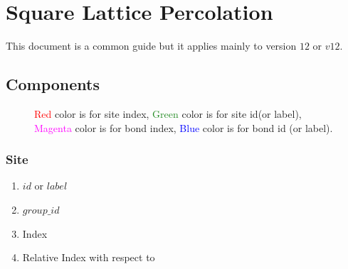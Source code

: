 %

	\chapter{Square Lattice Percolation}
	This document is a common guide but it applies mainly to version $12$ or $v12$.
	
	\section{Components}
	\begin{figure}
		\caption{\textcolor{red}{Red} color is for site index, \textcolor{ForestGreen}{Green} color is for site id(or label), \textcolor{magenta}{Magenta} color is for bond index, \textcolor{blue}{Blue} color is for bond id (or label).}
	\end{figure}
	\subsection{Site}
	\begin{enumerate}
		\item $id$ or $label$
		\item $group\_id$
		\item Index
		\item Relative Index with respect to 
	\end{enumerate}
